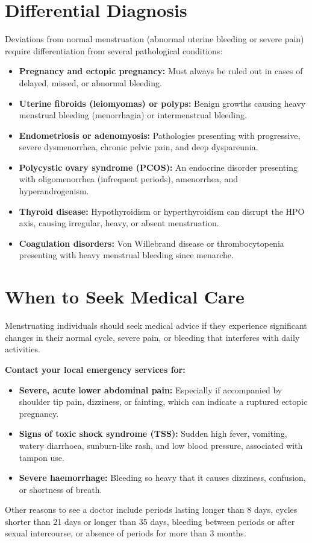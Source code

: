 \section*{Differential Diagnosis}
Deviations from normal menstruation (abnormal uterine bleeding or severe pain) require differentiation from several pathological conditions:
\begin{itemize}
    \item \textbf{Pregnancy and ectopic pregnancy:} Must always be ruled out in cases of delayed, missed, or abnormal bleeding.
    \item \textbf{Uterine fibroids (leiomyomas) or polyps:} Benign growths causing heavy menstrual bleeding (menorrhagia) or intermenstrual bleeding.
    \item \textbf{Endometriosis or adenomyosis:} Pathologies presenting with progressive, severe dysmenorrhea, chronic pelvic pain, and deep dyspareunia.
    \item \textbf{Polycystic ovary syndrome (PCOS):} An endocrine disorder presenting with oligomenorrhea (infrequent periods), amenorrhea, and hyperandrogenism.
    \item \textbf{Thyroid disease:} Hypothyroidism or hyperthyroidism can disrupt the HPO axis, causing irregular, heavy, or absent menstruation.
    \item \textbf{Coagulation disorders:} Von Willebrand disease or thrombocytopenia presenting with heavy menstrual bleeding since menarche.
\end{itemize}

\section*{When to Seek Medical Care}
Menstruating individuals should seek medical advice if they experience significant changes in their normal cycle, severe pain, or bleeding that interferes with daily activities.

\textbf{Contact your local emergency services for:}
\begin{itemize}
    \item \textbf{Severe, acute lower abdominal pain:} Especially if accompanied by shoulder tip pain, dizziness, or fainting, which can indicate a ruptured ectopic pregnancy.
    \item \textbf{Signs of toxic shock syndrome (TSS):} Sudden high fever, vomiting, watery diarrhoea, sunburn-like rash, and low blood pressure, associated with tampon use.
    \item \textbf{Severe haemorrhage:} Bleeding so heavy that it causes dizziness, confusion, or shortness of breath.
\end{itemize}
Other reasons to see a doctor include periods lasting longer than 8 days, cycles shorter than 21 days or longer than 35 days, bleeding between periods or after sexual intercourse, or absence of periods for more than 3 months.

